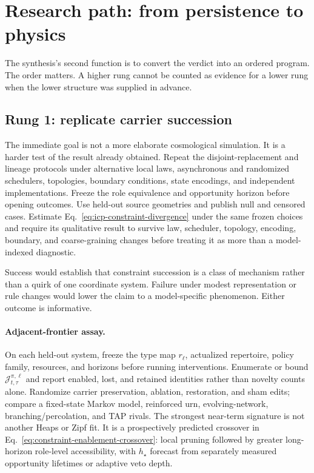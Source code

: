 \section{Research path: from persistence to physics}

The synthesis's second function is to convert the verdict into an ordered
program. The order matters. A higher rung cannot be counted as evidence for a
lower rung when the lower structure was supplied in advance.

\subsection{Rung 1: replicate carrier succession}

The immediate goal is not a more elaborate cosmological simulation. It is a
harder test of the result already obtained. Repeat the disjoint-replacement and
lineage protocols under alternative local laws, asynchronous and randomized
schedulers, topologies, boundary conditions, state encodings, and independent
implementations. Freeze the role equivalence and opportunity horizon before
opening outcomes. Use held-out source geometries and publish null and censored
cases. Estimate Eq.~\eqref{eq:icp-constraint-divergence} under the same frozen
choices and require its qualitative result to survive law, scheduler, topology,
encoding, boundary, and coarse-graining changes before treating it as more than
a model-indexed diagnostic.

Success would establish that constraint succession is a class of mechanism
rather than a quirk of one coordinate system. Failure under modest
representation or rule changes would lower the claim to a model-specific
phenomenon. Either outcome is informative.

\paragraph{Adjacent-frontier assay.}
On each held-out system, freeze the type map $r_\ell$, actualized repertoire,
policy family, resources, and horizons before running interventions. Enumerate
or bound $\mathcal J_{t,\tau}^{\pi,\ell}$ and report enabled, lost, and retained
identities rather than novelty counts alone. Randomize carrier preservation,
ablation, restoration, and sham edits; compare a fixed-state Markov model,
reinforced urn, evolving-network, branching/percolation, and TAP rivals. The
strongest near-term signature is not another Heaps or Zipf fit. It is a
prospectively predicted crossover in
Eq.~\eqref{eq:constraint-enablement-crossover}: local pruning followed by
greater long-horizon role-level accessibility, with $h_\star$ forecast from
separately measured opportunity lifetimes or adaptive veto depth.

